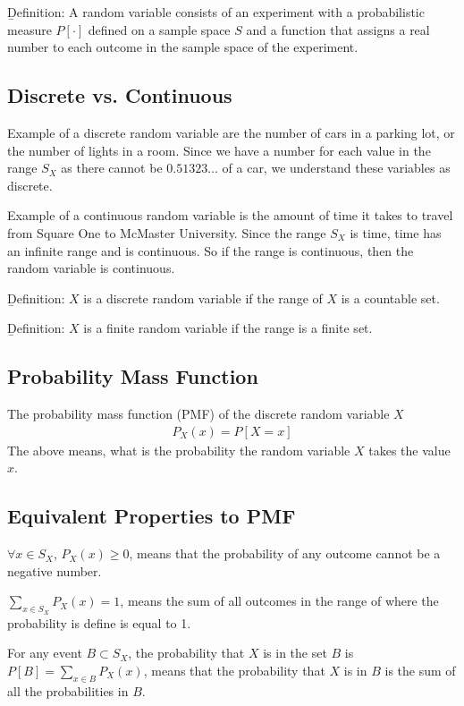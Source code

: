 \documentclass[12pt, titlepage, oneside]{article}
\begin{document}
	
\b{Definition}: A random variable consists of an experiment with a probabilistic measure $P[\cdot]$ defined on a sample space $S$ and a function that assigns a real number to each outcome in the sample space of the experiment.

\subsection{Discrete vs. Continuous}

Example of a discrete random variable are the number of cars in a parking lot, or the number of lights in a room. Since we have a number for each value in the range $S_X$ as there cannot be $0.51323\dots$ of a car, we understand these variables as discrete.

Example of a continuous random variable is the amount of time it takes to travel from Square One to McMaster University. Since the range $S_X$ is time, time has an infinite range and is continuous. So if the range is continuous, then the random variable is continuous. 

\b{Definition:} $X$ is a discrete random variable if the range of $X$ is a countable set.

\b{Definition:} $X$ is a finite random variable if the range is a finite set.

\subsection{Probability Mass Function}

The probability mass function (PMF) of the discrete random variable $X$
\begin{align}
P_X(x) = P[X=x]
\end{align}
The above means, what is the probability the random variable $X$ takes the value $x$.

\subsection{Equivalent Properties to PMF}

$\forall x \in S_X$, $P_X(x) \geq 0$, means that the probability of any outcome cannot be a negative number.

$\sum_{x\in S_X} P_X(x) = 1$, means the sum of all outcomes in the range of where the probability is define is equal to 1. 

For any event $B \subset S_X$, the probability that $X$ is in the set $B$ is $P[B] = \sum_{x\in B} P_X(x)$, means that the probability that $X$ is in $B$ is the sum of all the probabilities in $B$.
\end{document}
